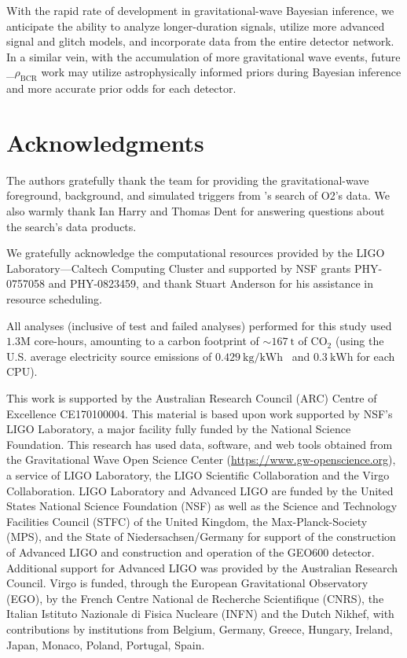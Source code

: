 \documentclass[useAMS,fleqn, usenatbib, final]{mnras}
\newcommand{\pycbc}{{\sc {{PyCBC}}}\xspace}
\newcommand{\mathcmd}[1]{{\sc \relax\ifmmode#1\else $#1$\fi}\xspace}
\newcommand{\bcr}{\mathcmd{\rho_\text{BCR}}}
\begin{document}
With the rapid rate of development in gravitational-wave Bayesian inference, we anticipate the ability to analyze longer-duration signals, utilize more advanced signal and glitch models, and incorporate data from the entire detector network. In a similar vein, with the accumulation of more gravitational wave events, future \bcr work may utilize astrophysically informed priors during Bayesian inference and more accurate prior odds for each detector.


\section*{Acknowledgments}{
The authors gratefully thank the \pycbc team for providing the gravitational-wave foreground, background, and simulated triggers from \pycbc's search of O2's data. We also warmly thank Ian Harry and Thomas Dent for answering questions about the \pycbc search's data products.  

We gratefully acknowledge the computational resources provided by the LIGO Laboratory—Caltech Computing Cluster and supported by NSF grants PHY-0757058 and PHY-0823459, and thank Stuart Anderson for his assistance in resource scheduling.

All analyses (inclusive of test and failed analyses) performed for this study used ${1.3\mathrm{M}}$ core-hours, amounting to a carbon footprint of ${\sim167\ \mathrm{t}}$ of ${\text{CO}_2}$ (using the U.S. average electricity source emissions of ${0.429\ \text{kg/kWh}}$~\citep{greenhouse} and ${0.3\ \text{kWh}}$ for each CPU).

This work is supported by the Australian Research Council (ARC) Centre of Excellence CE170100004. This material is based upon work supported by NSF’s LIGO Laboratory, a major facility fully funded by the National Science Foundation. This research has used data, software, and web tools obtained from the Gravitational Wave Open Science Center (\href{https://www.gw-openscience.org}{https://www.gw-openscience.org}), a service of LIGO Laboratory, the LIGO Scientific Collaboration and the Virgo Collaboration. LIGO Laboratory and Advanced LIGO are funded by the United States National Science Foundation (NSF) as well as the Science and Technology Facilities Council (STFC) of the United Kingdom, the Max-Planck-Society (MPS), and the State of Niedersachsen/Germany for support of the construction of Advanced LIGO and construction and operation of the GEO600 detector. Additional support for Advanced LIGO was provided by the Australian Research Council. Virgo is funded, through the European Gravitational Observatory (EGO), by the French Centre National de Recherche Scientifique (CNRS), the Italian Istituto Nazionale di Fisica Nucleare (INFN) and the Dutch Nikhef, with contributions by institutions from Belgium, Germany, Greece, Hungary, Ireland, Japan, Monaco, Poland, Portugal, Spain.
}
\end{document}
